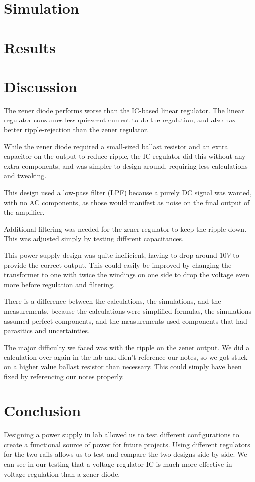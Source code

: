\documentclass[12pt]{article}
\begin{document}
\section{Simulation}

\section{Results}


\section{Discussion}


The zener diode performs worse than the IC-based linear regulator. The linear regulator consumes less quiescent current to do the regulation,
and also has better ripple-rejection than the zener regulator.

While the zener diode required a small-sized ballast resistor and an extra capacitor on the output to reduce ripple,
the IC regulator did this without any extra components, and was simpler to design around, requiring less calculations
and tweaking.

This design used a low-pass filter (LPF) because a purely DC signal was wanted, with no
AC components, as those would manifest as noise on the final output of the amplifier.

Additional filtering was needed for the zener regulator to keep the ripple down. This was adjusted
simply by testing different capacitances.

This power supply design was quite inefficient, having to drop around $10V$ to provide the correct
output. This could easily be improved by changing the transformer to one with twice the windings on
one side to drop the voltage even more before regulation and filtering.

There is a difference between the calculations, the simulations, and the measurements, because the
calculations were simplified formulas, the simulations assumed perfect components, and the
measurements used components that had parasitics and uncertainties.

The major difficulty we faced was with the ripple on the zener output. We did a 
calculation over again in the lab and didn't reference our notes, so we got stuck
on a higher value ballast resistor than necessary. This could simply have been fixed by referencing
our notes properly.

\section{Conclusion}
Designing a power supply in lab allowed us to test different configurations to create a functional source of power for future projects. 
Using different regulators for the two rails allows us to test and compare the two designs side by side. We can see in our testing that a voltage regulator IC is much more effective 
in voltage regulation than a zener diode.
\end{document}
